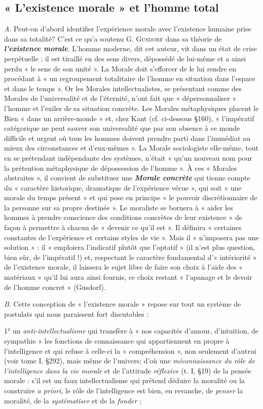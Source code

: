 \subsection{« L'existence morale » et l’homme total}%
{\it A}. Peut-on
d’abord identifier l'expérience morale avec l'existence humaine prise
dans sa totalité? C’est ce qu’a soutenu G. \textsc{Gusdorf} dans sa théorie
de \textbf{\textit {l'existence morale}}. L'homme moderne, dit cet auteur, vit dans un
état de crise perpétuelle ; il est tiraillé en des sens divers, dépossédé de
lui-même et a ainsi perdu « le sens de son unité ». La Morale doit
s’efforcer de le lui rendre en procédant à « un regroupement totalitaire
de l’homme en situation dans l’espace et dans le temps ». Or les
Morales intellectualistes, se présentant comme des Morales de l’universalité
et de l'éternité, n’ont fait que « dépersonnaliser » l’homme
et l’exiler de sa situation concrète. Les Morales métaphysiques placent
le Bien « dans un arrière-monde » et, chez Kant (cf. ci-dessous \S 160),
« l'impératif catégorique ne peut sauver son universalité que par
son absence à ce monde difficile et urgent où tous les hommes doivent
prendre parti dans l’immédiat au mieux des circonstances et d’eux-mêmes ».
La Morale sociologiste elle-même, tout en se prétendant
indépendante des systèmes, n’était « qu’un nouveau nom pour la
prétention métaphysique de dépossession de l’homme ». À ces « Morales
abstraites », il convient de substituer une \textbf{\textit {Morale concrète}} qui tienne
compte du « caractère historique, dramatique de l'expérience vécue »,
qui soit « une morale du temps présent » et qui pose en principe
« le pouvoir discrétionnaire de la personne sur sa propre destinée ».
Le moraliste se bornera à « aider les hommes à prendre conscience
des conditions concrètes de leur existence » de façon à permettre
à chacun de « devenir ce qu'il est ». Il définira « certaines constantes
de l’expérience et certains styles de vie ». Mais il « n’imposera pas
une solution » : il « emploiera l'indicatif plutôt que l’optatif » (il
n’est plus question, bien sûr, de l’impératif !) et, respectant le caractère
fondamental d’« intériorité » de l’existence morale, il laissera
le sujet libre de faire son choix à l’aide des « matériaux » qu’il lui aura
ainsi fournis, ce choix restant « l’apanage et le devoir de l’homme
concret » (Gusdorf).

{\it B}. Cette conception de « l’existence morale » repose sur tout un
système de postulats qui nous paraissent fort discutables :

1° un {\it anti-intellectualisme} qui transfère à « nos capacités d’amour,
d’intuition, de sympathie » les fonctions de connaissance qui appartiennent
en propre à l'intelligence et qui refuse à celle-ci la « compréhension »,
non seulement d'autrui (voir tome I, \S 292), mais
même de l’univers; d’où une {\it méconnaissance du rôle de l’intelligence
dans la vie morale} et de l'attitude {\it réflexive} (t. I, \S 19) de la
pensée morale : s’il est un faux intellectualisme qui prétend déduire
la moralité ou la construire {\it a priori}, le rôle de l’intelligence est bien,
en revanche, de {\it penser} la moralité, de la {\it systématiser} et de la {\it fonder} ;

